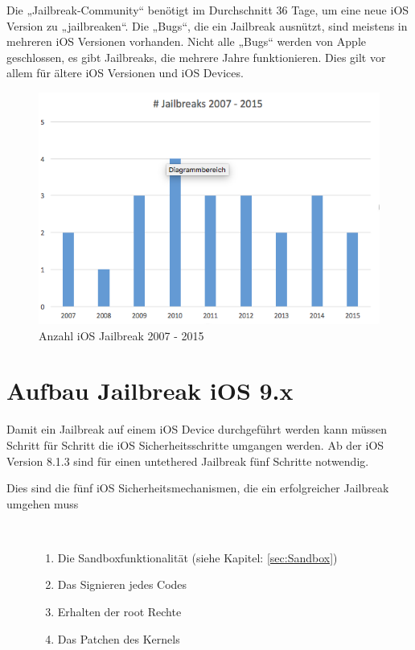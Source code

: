 \newpage
Die „Jailbreak-Community“ benötigt im Durchschnitt 36 Tage, um eine neue iOS Version zu „jailbreaken“. Die „Bugs“, die ein Jailbreak ausnützt, sind meistens in mehreren iOS Versionen vorhanden. Nicht alle „Bugs“ werden von Apple geschlossen, es gibt Jailbreaks, die mehrere Jahre funktionieren. Dies gilt vor allem für ältere iOS Versionen und iOS Devices.

\begin{figure}[!ht]
        \centering
                \includegraphics[scale=0.7]{Bilder/AnzahlJB}
        \caption{Anzahl iOS Jailbreak 2007 - 2015}
        	\label{fig:iOS Jailbreak}
\end{figure}


\section{Aufbau Jailbreak iOS 9.x}
\label{sec:JBAufbau}
Damit ein Jailbreak auf einem iOS Device durchgeführt werden kann müssen Schritt für Schritt die iOS Sicherheitsschritte umgangen werden. Ab der iOS Version 8.1.3 sind für einen \glqq untethered Jailbreak\grqq{} fünf Schritte notwendig.

\begin{description}
\item[Dies sind die fünf iOS Sicherheitsmechanismen, die ein erfolgreicher Jailbreak umgehen muss]~\par
	\begin{enumerate}
	    \item Die Sandboxfunktionalität (siehe Kapitel: \ref{sec:Sandbox}) 
	     \item Das Signieren jedes Codes 
	    \item Erhalten der \glqq root\grqq{} Rechte
	    \item Das Patchen des Kernels
	  \end{enumerate}
\end{description} 

